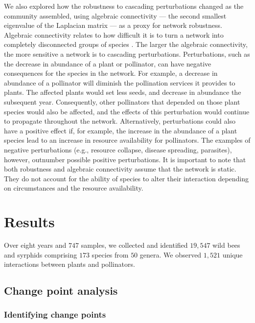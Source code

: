 \documentclass[12pt]{article}
\begin{document}
We also explored how the robustness to cascading perturbations changed
as the community assembled, using algebraic connectivity --- the
second smallest eigenvalue of the Laplacian matrix
\citep{fiedler1973algebraic} --- as a proxy for network robustness.
Algebraic connectivity relates to how difficult it is to turn a
network into completely disconnected groups of species
\citep{costa2007characterization, gibert2013spatial}. The larger the
algebraic connectivity, the more sensitive a network is to cascading
perturbations. Perturbations, such as the decrease in abundance of a
plant or pollinator, can have negative consequences for the species in
the network. For example, a decrease in abundance of a pollinator will
diminish the pollination services it provides to plants. The affected
plants would set less seeds, and decrease in abundance the subsequent
year. Consequently, other pollinators that depended on those plant
species would also be affected, and the effects of this perturbation
would continue to propagate throughout the network. Alternatively,
perturbations could also have a positive effect if, for example, the
increase in the abundance of a plant species lead to an increase in
resource availability for pollinators. The examples of negative
perturbations (e.g., resource collapse, disease spreading, parasites),
however, outnumber possible positive perturbations. It is important to
note that both robustness and algebraic connectivity assume that the
network is static. They do not account for the ability of species to
alter their interaction depending on circumstances and the resource
availability.

\section*{Results}
\label{sec:results}

Over eight years and $747$ samples, we collected and identified
$19,547$ wild bees and syrphids comprising $173$ species from $50$
genera. We observed $1,521$ unique interactions between plants and
pollinators.

\subsection*{Change point analysis}
\subsubsection*{Identifying change points}
\end{document}
